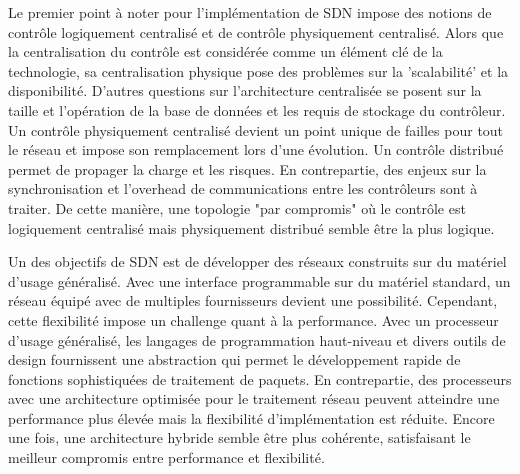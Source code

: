 Le premier point à noter pour l'implémentation de SDN impose des notions de contrôle logiquement centralisé et de contrôle physiquement centralisé. Alors que la centralisation du contrôle est considérée comme un élément clé de la technologie, sa centralisation physique pose des problèmes sur la 'scalabilité' et la disponibilité. D'autres questions sur l'architecture centralisée se posent sur la taille et l'opération de la base de données et les requis de stockage du contrôleur. Un contrôle physiquement centralisé devient un point unique de failles pour tout le réseau et impose son remplacement lors d'une évolution. Un contrôle distribué permet de propager la charge et les risques. En contrepartie, des enjeux sur la synchronisation et l'overhead de communications entre les contrôleurs sont à traiter. De cette manière, une topologie "par compromis" où le contrôle est logiquement centralisé mais physiquement distribué semble être la plus logique. \cite{sdnbookControlDataPlanes} \cite{SurveySDNArchi}



Un des objectifs de SDN est de développer des réseaux construits sur du matériel d'usage généralisé. Avec une interface programmable sur du matériel standard, un réseau équipé avec de multiples fournisseurs devient une possibilité. Cependant, cette flexibilité impose un challenge quant à la performance. Avec un processeur d'usage généralisé, les langages de programmation haut-niveau et divers outils de design fournissent une abstraction qui permet le développement rapide de fonctions sophistiquées de traitement de paquets. En contrepartie, des processeurs avec une architecture optimisée pour le traitement réseau peuvent atteindre une performance plus élevée mais la flexibilité d'implémentation est réduite. Encore une fois, une architecture hybride semble être plus cohérente, satisfaisant le meilleur compromis entre performance et flexibilité. \cite{ImplementationKeyChallenges}



